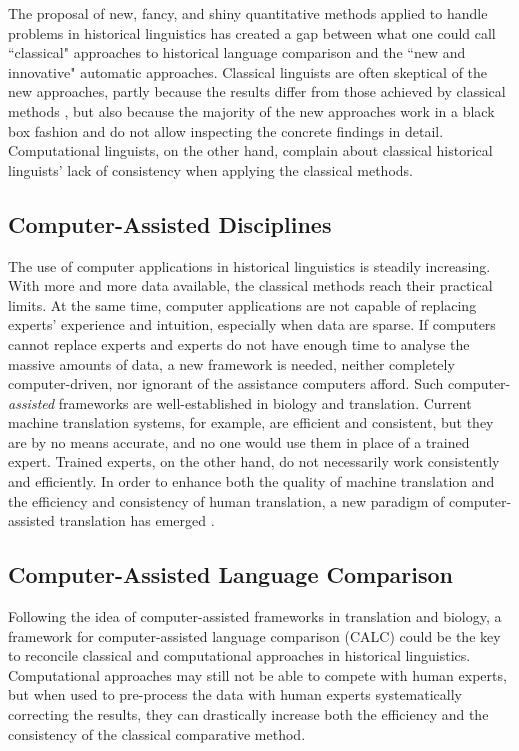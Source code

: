 \documentclass[xetex]{scrartcl}
\begin{document}
The proposal of new, fancy, and shiny quantitative methods applied to handle problems in historical
linguistics has created a gap between what one could call ``classical" approaches to historical
language comparison and the ``new and innovative" automatic approaches.
Classical linguists are often skeptical of the new approaches, partly because the results differ from
those achieved by classical methods \citep{Anthony2015,Holm2007}, but also because the majority of the
new approaches work in a black box fashion and do not allow inspecting the concrete findings in
detail. Computational linguists, on the other hand, complain about classical historical linguists' lack
of consistency when applying the classical methods.

\subsection{Computer-Assisted Disciplines}

The use of computer applications in historical linguistics is steadily increasing. With more and
more data available, the classical methods reach their practical limits. At the same time, computer
applications are not capable of replacing experts' experience and intuition, especially when data
are sparse. If computers cannot replace experts and experts do not have enough time to analyse the
massive amounts of data, a new framework is needed, neither completely computer-driven, nor ignorant
of the assistance computers afford. Such computer-\emph{assisted} frameworks are well-established in
biology and translation. Current machine translation systems, for example, are efficient and
consistent, but they are by no means accurate, and no one would use them in place of a trained
expert. Trained experts, on the other hand, do not necessarily work consistently and efficiently. In
order to enhance both the quality of machine translation and the efficiency and consistency of human
translation, a new paradigm of computer-assisted translation has emerged \citep[3]{Barrachina2008}.

\subsection{Computer-Assisted Language Comparison}

Following the idea of computer-assisted frameworks in translation and biology, a framework for
computer-assisted language comparison (CALC) could be the key to reconcile classical and
computational approaches in historical linguistics. Computational approaches may still not be able
to compete with human experts, but when used to pre-process the data with human experts
systematically correcting the results, they can drastically increase both the efficiency and the
consistency of the classical comparative method.
\end{document}
